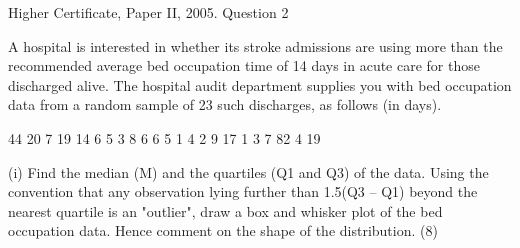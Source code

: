 \documentclass[a4paper,12pt]{article}
\begin{document}
Higher Certificate, Paper II, 2005. Question 2
\begin{framed}
 A hospital is interested in whether its stroke admissions are using more than the recommended average bed occupation time of 14 days in acute care for those discharged alive.  The hospital audit department supplies you with bed occupation data from a random sample of 23 such discharges, as follows (in days). 
 
44 20   7 19 14   6   5   3   8   6   6   5   1   4   2   9 17   1   3   7 82   4 19  
 
 
(i) Find the median (M) and the quartiles (Q1 and Q3) of the data.  Using the convention that any observation lying further than 1.5(Q3 – Q1) beyond the nearest quartile is an "outlier", draw a box and whisker plot of the bed occupation data.  Hence comment on the shape of the distribution. (8) 
 \end{framed}
 
\end{document}
